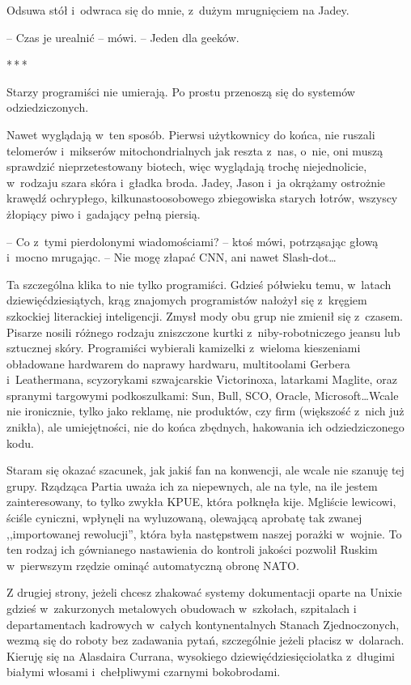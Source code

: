 \documentclass[oneside,polish,12pt,sfheadings]{mwbk}
\newcommand{\threeast}{\bigskip\par\centerline{*\,*\,*}\medskip\par}%
\begin{document}
Odsuwa stół i~odwraca się do mnie, z~dużym mrugnięciem na Jadey.

-- Czas je urealnić -- mówi. -- Jeden dla geeków.

\threeast

Starzy programiści nie umierają. Po prostu przenoszą się do systemów
odziedziczonych.

Nawet wyglądają w~ten sposób. Pierwsi użytkownicy do końca, nie ruszali
telomerów i~mikserów mitochondrialnych jak reszta z~nas, o~nie, oni
muszą sprawdzić nieprzetestowany biotech, więc wyglądają trochę
niejednolicie, w~rodzaju szara skóra i~gładka broda. Jadey, Jason i~ja
okrążamy ostrożnie krawędź ochrypłego, kilkunastoosobowego zbiegowiska
starych łotrów, wszyscy żłopiący piwo i~gadający pełną piersią.

-- Co z~tymi pierdolonymi wiadomościami? -- ktoś mówi, potrząsając głową i~mocno mrugając. -- Nie mogę złapać CNN, ani nawet Slash-dot\ldots

Ta szczególna klika to nie tylko programiści. Gdzieś półwieku temu, w~latach dziewięćdziesiątych, krąg znajomych programistów nałożył się z~kręgiem szkockiej literackiej inteligencji. Zmysł mody obu grup nie
zmienił się z~czasem. Pisarze nosili różnego rodzaju zniszczone kurtki z~niby-robotniczego jeansu lub sztucznej skóry. Programiści wybierali
kamizelki z~wieloma kieszeniami obładowane hardwarem do naprawy
hardwaru, multitoolami Gerbera i~Leathermana, scyzorykami szwajcarskie
Victorinoxa, latarkami Maglite, oraz spranymi targowymi podkoszulkami: Sun,
Bull, SCO, Oracle, Microsoft\ldots Wcale nie ironicznie, tylko jako
reklamę, nie produktów, czy firm (większość z~nich już znikła), ale
umiejętności, nie do końca zbędnych, hakowania ich odziedziczonego kodu.

Staram się okazać szacunek, jak jakiś fan na konwencji, ale wcale nie
szanuję tej grupy. Rządząca Partia uważa ich za niepewnych, ale na tyle,
na ile jestem zainteresowany, to tylko zwykła KPUE, która połknęła kije.
Mgliście lewicowi, ściśle cyniczni, wpłynęli na wyluzowaną, olewającą
aprobatę tak zwanej ,,importowanej rewolucji'', która była następstwem
naszej porażki w~wojnie. To ten rodzaj ich gównianego nastawienia do
kontroli jakości pozwolił Ruskim w~pierwszym rzędzie ominąć automatyczną
obronę NATO.


Z drugiej strony, jeżeli chcesz zhakować systemy dokumentacji oparte na
Unixie gdzieś w~zakurzonych metalowych obudowach w~szkołach, szpitalach
i departamentach kadrowych w~całych kontynentalnych Stanach
Zjednoczonych, wezmą się do roboty bez zadawania pytań, szczególnie
jeżeli płacisz w~dolarach. Kieruję się na Alasdaira Currana, wysokiego
dziewięćdziesięciolatka z~długimi białymi włosami i~chełpliwymi czarnymi
bokobrodami.
\end{document}
